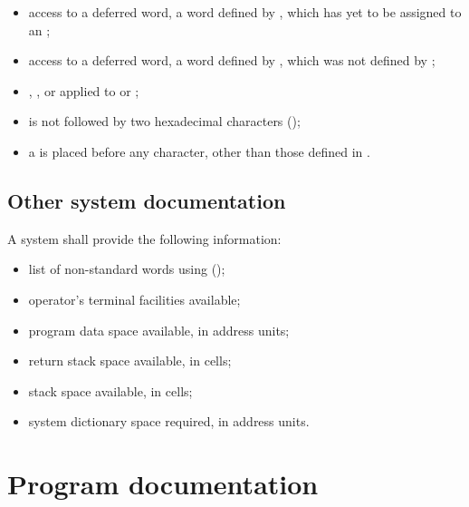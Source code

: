 
\begin{itemize}
\item access to a deferred word, a word defined by ,
	which has yet to be assigned to an ;
%
\item access to a deferred word, a word defined by ,
	which was not defined by ;
%
\item {}, ,
	 or  applied to 
	or ;
\end{itemize}


\begin{itemize}
	\item {} is not followed by two hexadecimal characters ();
	\item a \bs{} is placed before any character, other than those defined in
		.
\end{itemize}


\subsection{Other system documentation} %

A system shall provide the following information:

\begin{itemize}
\item list of non-standard words using 
	();
%
\item operator's terminal facilities available;
%
\item program data space available, in address units;
%
\item return stack space available, in cells;
%
\item stack space available, in cells;
%
\item system dictionary space required, in address units.
\end{itemize}



\section{Program documentation} %
\label{doc:program}

